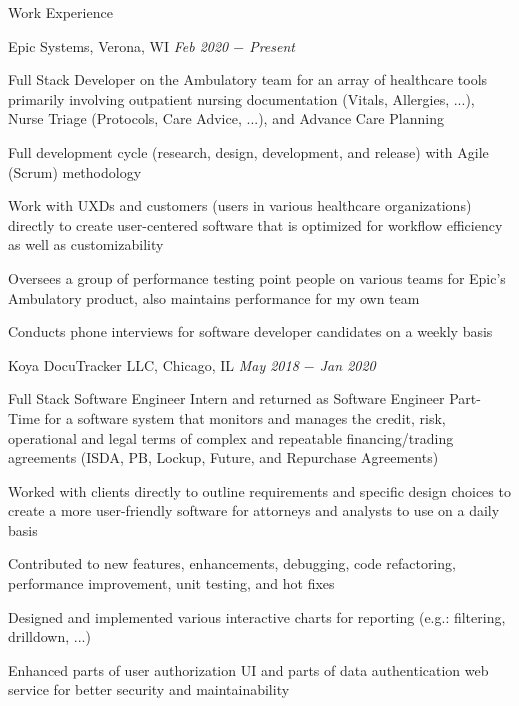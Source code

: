 \documentclass{resume}
\begin{document}
\begin{rSection}{Work Experience}

\begin{rSubsection}{Epic Systems, Verona, WI} {\textit{Feb 2020 $-$ Present}}
{}

    \item Full Stack Developer on the Ambulatory team for an array of healthcare tools primarily involving outpatient nursing documentation (Vitals, Allergies, ...), Nurse Triage (Protocols, Care Advice, ...), and Advance Care Planning
    \item Full development cycle (research, design, development, and release) with Agile (Scrum) methodology
    \item Work with UXDs and customers (users in various healthcare organizations) directly to create user-centered software that is optimized for workflow efficiency as well as customizability
    \item Oversees a group of performance testing point people on various teams for Epic's Ambulatory product, also maintains performance for my own team
    \item Conducts phone interviews for software developer candidates on a weekly basis

\end{rSubsection}

\begin{rSubsection}{Koya DocuTracker LLC, Chicago, IL} {\textit{May 2018 $-$ Jan 2020}}
{}

    \item Full Stack Software Engineer Intern and returned as Software Engineer Part-Time for a software system that monitors and manages the credit, risk, operational and legal terms of complex and repeatable financing/trading agreements (ISDA, PB, Lockup, Future, and Repurchase Agreements)
    \item Worked with clients directly to outline requirements and specific design choices to create a more user-friendly software for attorneys and analysts to use on a daily basis
    \item Contributed to new features, enhancements, debugging, code refactoring, performance improvement, unit testing, and hot fixes
    \item Designed and implemented various interactive charts for reporting (e.g.: filtering, drilldown, ...)
    \item Enhanced parts of user authorization UI and parts of data authentication web service for better security and maintainability

\end{rSubsection}

\end{rSection}
\end{document}
